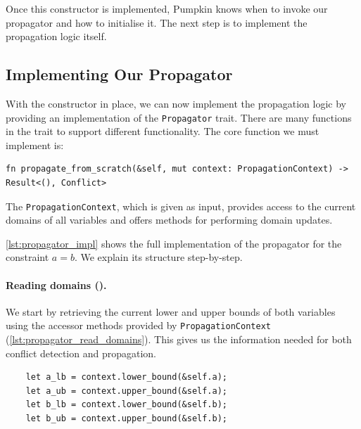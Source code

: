 \documentclass{article}
\begin{document}
Once this constructor is implemented, Pumpkin knows when to invoke our propagator and how to initialise it.  
The next step is to implement the propagation logic itself.


\subsection{Implementing Our Propagator}
With the constructor in place, we can now implement the propagation logic by providing an implementation of the \texttt{Propagator} trait.
There are many functions in the trait to support different functionality. The core function we must implement is:
\begin{verbatim}
fn propagate_from_scratch(&self, mut context: PropagationContext) -> Result<(), Conflict>
\end{verbatim}
The \texttt{PropagationContext}, which is given as input, provides access to the current domains of all variables and offers methods for performing domain updates.

\autoref{lst:propagator_impl} shows the full implementation of the propagator for the constraint $a = b$.  
We explain its structure step-by-step.

\paragraph{Reading domains ().}  
    We start by retrieving the current lower and upper bounds of both variables using the accessor methods provided by \texttt{PropagationContext} (\autoref{lst:propagator_read_domains}).  
    This gives us the information needed for both conflict detection and propagation.
    \begin{listing}[H]
        \begin{verbatim}
    let a_lb = context.lower_bound(&self.a);
    let a_ub = context.upper_bound(&self.a);
    let b_lb = context.lower_bound(&self.b);
    let b_ub = context.upper_bound(&self.b);
        \end{verbatim}
        \caption{Reading domains}
        \label{lst:propagator_read_domains}
    \end{listing}
\end{document}
